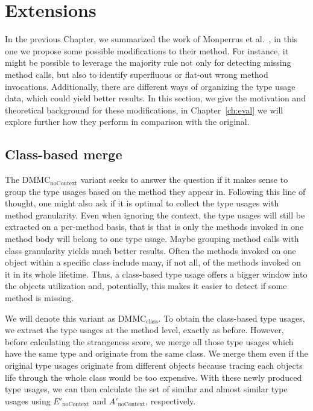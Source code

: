 \chapter{Extensions}\label{ch:ext}

In the previous Chapter, we summarized the work of Monperrus et al.~\cite{monperrus2010detecting}\cite{monperrus2013detecting}, in this one we propose some possible modifications to their method.
For instance, it might be possible to leverage the majority rule not only for detecting missing method calls, but also to identify superfluous or flat-out wrong method invocations.
Additionally, there are different ways of organizing the type usage data, which could yield better results.
In this section, we give the motivation and theoretical background for these modifications, in Chapter~\ref{ch:eval} we will explore further how they perform in comparison with the original.

\section{Class-based merge}

The $\text{DMMC}_{\text{noContext}}$ variant seeks to answer the question if it makes sense to group the type usages based on the method they appear in.
Following this line of thought, one might also ask if it is optimal to collect the type usages with method granularity.
Even when ignoring the context, the type usages will still be extracted on a per-method basis, that is that is only the methods invoked in one method body will belong to one type usage.
Maybe grouping method calls with class granularity yields much better results.
Often the methods invoked on one object within a specific class include many, if not all, of the methods invoked on it in its whole lifetime.
Thus, a class-based type usage offers a bigger window into the objects utilization and, potentially, this makes it easier to detect if some method is missing.

We will denote this variant as $\text{DMMC}_{\text{class}}$.
To obtain the class-based type usages, we extract the type usages at the method level, exactly as before.
However, before calculating the strangeness score, we merge all those type usages which have the same type and originate from the same class.
We merge them even if the original type usages originate from different objects because tracing each objects life through the whole class would be too expensive.
With these newly produced type usages, we can then calculate the set of similar and almost similar type usages using $E'_{\text{noContext}}$ and $A'_{\text{noContext}}$, respectively.

